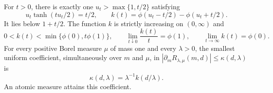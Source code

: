 \begin{theorem}
\label{thm:sharp-common-derivative}
For $t>0$, there is exactly one $u_t>\max\{1,t/2\}$ satisfying
\begin{equation}
 u_t\tanh(tu_t/2)=t/2,
 \qquad
 k(t)=\phi(u_t-t/2)-\phi(u_t+t/2).
 \label{eq:sharp-k-root}
\end{equation}
It lies below $1+t/2$. The function $k$ is strictly increasing on
$(0,\infty)$ and
\begin{equation}
 0<k(t)<\min\{\phi(0),t\phi(1)\},\qquad
 \lim_{t\downarrow0}\frac{k(t)}{t}=\phi(1),\qquad
 \lim_{t\to\infty}k(t)=\phi(0).
 \label{eq:sharp-k-properties}
\end{equation}
For every positive Borel measure $\mu$ of mass one and every $\lambda>0$,
the smallest uniform coefficient, simultaneously over $m$ and $\mu$, in
$|\partial_m R_{\lambda,\mu}(m,d)|\leq\kappa(d,\lambda)$ is
\begin{equation}
 \kappa(d,\lambda)=\lambda^{-1}k(d/\lambda).
 \label{eq:sharp-common-coefficient}
\end{equation}
An atomic measure attains this coefficient.
\end{theorem}
